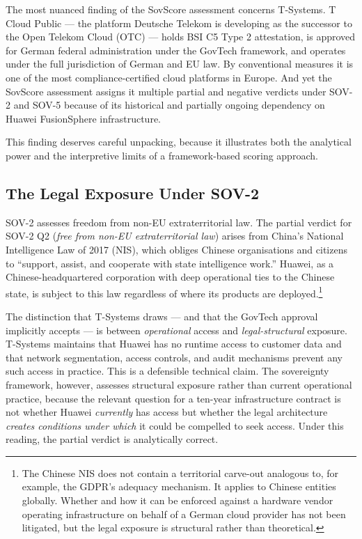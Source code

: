 The most nuanced finding of the SovScore assessment concerns T-Systems. T Cloud Public — the platform Deutsche Telekom is developing as the successor to the Open Telekom Cloud (OTC) — holds BSI C5 Type 2 attestation, is approved for German federal administration under the GovTech framework, and operates under the full jurisdiction of German and EU law. By conventional measures it is one of the most compliance-certified cloud platforms in Europe. And yet the SovScore assessment assigns it multiple partial and negative verdicts under SOV-2 and SOV-5 because of its historical and partially ongoing dependency on Huawei FusionSphere infrastructure.

This finding deserves careful unpacking, because it illustrates both the analytical power and the interpretive limits of a framework-based scoring approach.

\subsection{The Legal Exposure Under SOV-2}

SOV-2 assesses freedom from non-EU extraterritorial law. The partial verdict for SOV-2 Q2 (\emph{free from non-EU extraterritorial law}) arises from China's National Intelligence Law of 2017 (NIS), which obliges Chinese organisations and citizens to ``support, assist, and cooperate with state intelligence work.'' Huawei, as a Chinese-headquartered corporation with deep operational ties to the Chinese state, is subject to this law regardless of where its products are deployed.\footnote{The Chinese NIS does not contain a territorial carve-out analogous to, for example, the GDPR's adequacy mechanism. It applies to Chinese entities globally. Whether and how it can be enforced against a hardware vendor operating infrastructure on behalf of a German cloud provider has not been litigated, but the legal exposure is structural rather than theoretical.}

The distinction that T-Systems draws — and that the GovTech approval implicitly accepts — is between \emph{operational} access and \emph{legal-structural} exposure. T-Systems maintains that Huawei has no runtime access to customer data and that network segmentation, access controls, and audit mechanisms prevent any such access in practice. This is a defensible technical claim. The sovereignty framework, however, assesses structural exposure rather than current operational practice, because the relevant question for a ten-year infrastructure contract is not whether Huawei \emph{currently} has access but whether the legal architecture \emph{creates conditions under which} it could be compelled to seek access. Under this reading, the partial verdict is analytically correct.

